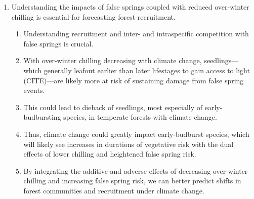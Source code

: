 \documentclass{article}\usepackage[]{graphicx}\usepackage[]{color}
\begin{document}
\begin{enumerate}
\item Understanding the impacts of false springs coupled with reduced over-winter chilling is essential for forecasting forest recruitment. %
  \begin{enumerate}
    \item Understanding recruitment and inter- and intraspecific competition with false springs is crucial. 
  \item With over-winter chilling decreasing with climate change, seedlings---which generally leafout earlier than later lifestages to gain access to light (CITE)---are likely more at risk of sustaining damage from false spring events. 
  \item This could lead to dieback of seedlings, most especially of early-budbursting species, in temperate forests with climate change. %
  \item Thus, climate change could greatly impact early-budburst species, which will likely see increases in durations of vegetative risk with the dual effects of lower chilling and heightened false spring risk. 
  \item By integrating the additive and adverse effects of decreasing over-winter chilling and increasing false spring risk, we can better predict shifts in forest communities and recruitment under climate change.   %
  \end{enumerate} %
\end{enumerate}
\end{document}
